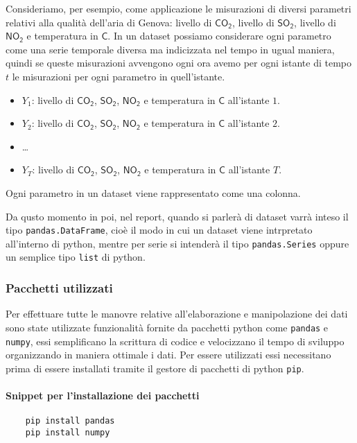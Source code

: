 \begin{esempio}
    Consideriamo, per esempio, come applicazione le misurazioni di diversi parametri
    relativi alla qualità dell'aria di Genova: livello di $\mathsf{CO_2}$,
    livello di $\mathsf{SO_2}$, livello di $\mathsf{NO_2}$ e temperatura in \textdegree$\mathsf{C}$.
    In un dataset possiamo considerare ogni parametro come una serie temporale diversa ma indicizzata
    nel tempo in ugual maniera, quindi se queste misurazioni avvengono ogni ora avemo
    per ogni istante di tempo $t$ le misurazioni per ogni parametro in quell'istante.
    \begin{itemize}
        \setlength\itemsep{-0.5em}
        \item $Y_1$: livello di $\mathsf{CO_2}$, $\mathsf{SO_2}$, $\mathsf{NO_2}$ e temperatura in \textdegree$\mathsf{C}$ all'istante $1$.
        \item $Y_2$: livello di $\mathsf{CO_2}$, $\mathsf{SO_2}$, $\mathsf{NO_2}$ e temperatura in \textdegree$\mathsf{C}$ all'istante $2$.
        \item \dots
        \item $Y_T$: livello di $\mathsf{CO_2}$, $\mathsf{SO_2}$, $\mathsf{NO_2}$ e temperatura in \textdegree$\mathsf{C}$ all'istante $T$.
    \end{itemize}
    Ogni parametro in un dataset viene rappresentato come una colonna.
\end{esempio}
Da qusto momento in poi, nel report, quando si parlerà di dataset varrà inteso il tipo
\texttt{pandas.DataFrame}, cioè il modo in cui un dataset viene intrpretato all'interno
di python, mentre per serie si intenderà il tipo \texttt{pandas.Series} oppure un semplice
tipo \texttt{list} di python.

\subsubsection{Pacchetti utilizzati}
Per effettuare tutte le manovre relative all'elaborazione e manipolazione dei dati sono state
utilizzate funzionalità fornite da pacchetti python come \texttt{pandas} e \texttt{numpy}, essi semplificano
la scrittura di codice e velocizzano il tempo di sviluppo organizzando in maniera ottimale
i dati. Per essere utilizzati essi necessitano prima di essere installati tramite il
gestore di pacchetti di python \texttt{pip}.
\paragraph{Snippet per l'installazione dei pacchetti}
\begin{verbatim}
    pip install pandas
    pip install numpy
\end{verbatim}
